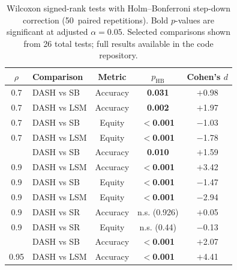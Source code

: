 \documentclass[11pt]{article}
\newcommand{\rhovar}{\rho}
\begin{document}
\begin{table}[htbp]
\centering
\caption{Wilcoxon signed-rank tests with Holm--Bonferroni step-down correction
(50~paired repetitions). Bold $p$-values are significant at adjusted
$\alpha = 0.05$. Selected comparisons shown from 26 total tests;
full results available in the code repository.}
\label{tab:significance}
\small
\begin{tabular}{clccc}
\toprule
$\rhovar$ & \textbf{Comparison} & \textbf{Metric} & $p_{\text{HB}}$ & Cohen's $d$ \\
\midrule
0.7  & DASH vs SB  & Accuracy & \textbf{0.031} & $+$0.98 \\
0.7  & DASH vs LSM & Accuracy & \textbf{0.002} & $+$1.97 \\
0.7  & DASH vs SB  & Equity   & \textbf{$<$0.001} & $-$1.03 \\
0.7  & DASH vs LSM & Equity   & \textbf{$<$0.001} & $-$1.78 \\
\addlinespace
0.9  & DASH vs SB  & Accuracy & \textbf{0.010} & $+$1.59 \\
0.9  & DASH vs LSM & Accuracy & \textbf{$<$0.001} & $+$3.42 \\
0.9  & DASH vs SB  & Equity   & \textbf{$<$0.001} & $-$1.47 \\
0.9  & DASH vs LSM & Equity   & \textbf{$<$0.001} & $-$2.94 \\
0.9  & DASH vs SR  & Accuracy & n.s. (0.926) & $+$0.05 \\
0.9  & DASH vs SR  & Equity   & n.s. (0.44) & $-$0.13 \\
\addlinespace
0.95 & DASH vs SB  & Accuracy & \textbf{$<$0.001} & $+$2.07 \\
0.95 & DASH vs LSM & Accuracy & \textbf{$<$0.001} & $+$4.41 \\
\bottomrule
\end{tabular}
\end{table}
\end{document}
